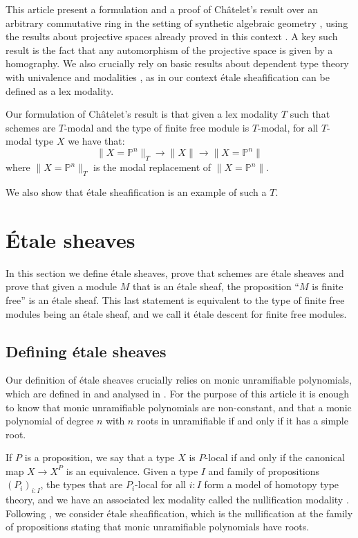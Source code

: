 \documentclass[10pt,a4paper]{article}
\theoremstyle{definition}
\newcommand{\propTrunc}[1]{\lVert #1 \rVert}
\newcommand{\bP}{\mathbb{P}}
\begin{document}
This article present a formulation and a proof of Ch\^atelet's result over an arbitrary commutative ring
in the setting of synthetic algebraic geometry \cite{draft}, using the results about projective
spaces already proved in this context \cite{sag-projective}. A key such result is the fact that any automorphism of the projective space is given by a homography. We also crucially rely on basic results about dependent type theory with univalence \cite{hott}
and modalities \cite{modalities}, as in our context \'etale sheafification can be defined
as a lex modality. 

Our formulation of Ch\^atelet's result is that given a lex modality $T$ such that schemes are $T$-modal and the type of finite free module is $T$-modal, for all $T$-modal type $X$ we have that:
\[\propTrunc{X=\bP^n}_{T} \to \propTrunc{X} \to \propTrunc{X=\bP^n}\]
where $\propTrunc{X=\bP^n}_{T}$ is the modal replacement of $\propTrunc{X=\bP^n}$. 

We also show that \'etale sheafification is an example of such a $T$.


\section{\'Etale sheaves}
\label{etale-sheaves}

In this section we define étale sheaves, prove that schemes are étale sheaves and prove that given a module $M$ that is an étale sheaf, the proposition ``$M$ is finite free'' is an étale sheaf.  This last statement is equivalent to the type of finite free modules being an étale sheaf, and we call it étale descent for finite free modules.


\subsection{Defining étale sheaves}

Our definition of étale sheaves crucially relies on monic unramifiable polynomials, which are defined in \cite{wraith79} and analysed in \cite{coqazumaya}. For the purpose of this article it is enough to know that monic unramifiable polynomials are non-constant, and that a monic polynomial of degree $n$ with $n$ roots in unramifiable if and only if it has a simple root.

If $P$ is a proposition, we say that a type $X$ is $P$-local if and only if the canonical map $X\to X^P$ is an equivalence.
Given a type $I$ and family of propositions $(P_i)_{i:I}$, the types that are $P_i$-local for all $i:I$ form a model of homotopy type theory, and we have an associated lex modality called the nullification modality \cite{modalities,Quirin16}.
Following \cite{wraith79}, we consider \'etale sheafification, which is the nullification at the family of propositions stating that monic unramifiable polynomials have roots.
\end{document}
